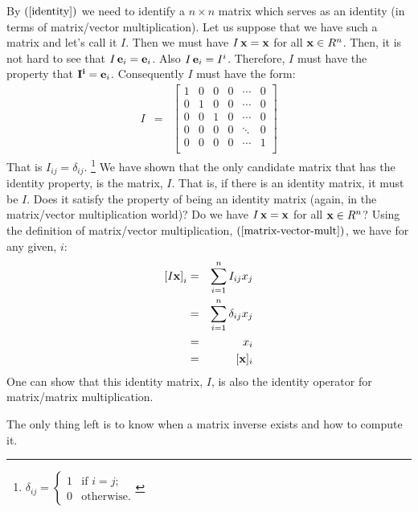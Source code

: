 \documentclass{article}
\begin{document}
By $(\ref{identity})$ we need to identify a $n \times n$ matrix which serves as an
identity (in terms of matrix/vector multiplication).
Let us suppose that we have such a matrix and let's call it $I$.
Then we must have $I \, {\bf x} = {\bf x}$ for all ${\bf x} \in R^n$. 
Then, it is not hard
to see that $I \, {\bf e}_{i} = {\bf e}_i$. Also $I \, {\bf e}_i = I^i$. Therefore, $I$
must have the property that ${\bf I^i} = {\bf e}_i$. Consequently $I$ must have the form:
\begin{eqnarray}
  I & = & \left[
      \begin{array}{cccccc}
        1 & 0 & 0 & 0 & \cdots & 0 \\
        0 & 1 & 0 & 0 & \cdots & 0 \\
        0 & 0 & 1 & 0 & \cdots & 0 \\
        0 & 0 & 0 & 0 & \ddots & 0 \\
        0 & 0 & 0 & 0 & \cdots & 1 \\
      \end{array}
  \right]
\end{eqnarray}
That is $I_{ij} = \delta_{ij}$.%
\footnote{$\delta_{ij} = \left\{\begin{array}{ll}
                                 1 & \text{if $i = j$;} \\
                                 0 & \text{otherwise.}
                               \end{array} \right.$}
We have shown that the only candidate matrix that has the identity property, is the
matrix, $I$. That is, if there is an identity matrix, it must be $I$. Does it satisfy
the property of being an identity matrix (again, in the matrix/vector multiplication world)?
Do we have $I \, {\bf x} = {\bf x}$ for all ${\bf x} \in R^n$?
Using the definition of matrix/vector multiplication, $(\ref{matrix-vector-mult})$, we
have for any given, $i$:
\begin{eqnarray}
  \left[I {\bf x}\right]_i & = & \sum_{i=1}^n I_{ij} x_j \nonumber \\
                           & = & \sum_{i=1}^n \delta_{ij} x_j \nonumber \\
                           & = & x_i \nonumber \\
                           & = & [{\bf x}]_i
\end{eqnarray}
One can show that this identity matrix, $I$, is also the identity operator for
matrix/matrix multiplication.

The only thing left is to know when a matrix inverse exists and how to compute it.
\end{document}
